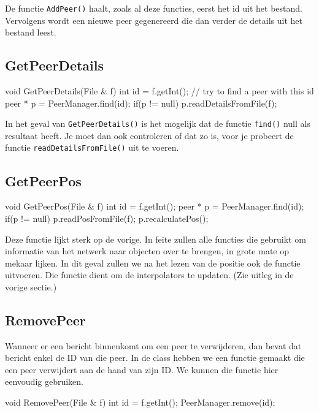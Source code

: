 De functie \texttt{AddPeer()} haalt, zoals al deze functies, eerst het id uit het bestand. Vervolgens wordt een nieuwe peer gegenereerd die dan verder de details uit het bestand leest.

\subsection{GetPeerDetails}
\begin{code}
void GetPeerDetails(File & f)
{
   int id = f.getInt();
   // try to find a peer with this id
   peer * p = PeerManager.find(id);
   if(p != null)
   {
      p.readDetailsFromFile(f);
   }
}
\end{code}

In het geval van \texttt{GetPeerDetails()} is het mogelijk dat de functie \texttt{find()} null als resultaat heeft. Je moet dan ook controleren of dat zo is, voor je probeert de functie \texttt{readDetailsFromFile()} uit te voeren.

\subsection{GetPeerPos}
\begin{code}
void GetPeerPos(File & f)
{
   int id = f.getInt();
   peer * p = PeerManager.find(id);
   if(p != null)
   {
      p.readPosFromFile(f);
      p.recalculatePos();
   }
}
\end{code}

Deze functie lijkt sterk op de vorige. In feite zullen alle functies die gebruikt om informatie van het netwerk naar objecten over te brengen, in grote mate op mekaar lijken. In dit geval zullen we na het lezen van de positie ook de functie  uitvoeren. Die functie dient om de interpolators te updaten. (Zie uitleg in de vorige sectie.)

\subsection{RemovePeer}
Wanneer er een bericht binnenkomt om een peer te verwijderen, dan bevat dat bericht enkel de ID van die peer. In de class  hebben we een functie gemaakt die een peer verwijdert aan de hand van zijn ID. We kunnen die functie hier eenvoudig gebruiken.

\begin{code}
void RemovePeer(File & f)
{
   int id = f.getInt();
   PeerManager.remove(id);
}
\end{code}

